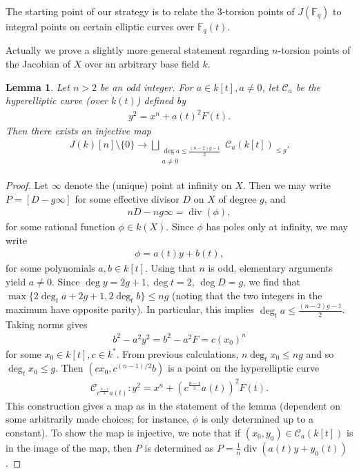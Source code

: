 \documentclass[11pt]{article}
\theoremstyle{plain}
\newtheorem{lemma}[theorem]{Lemma}
\theoremstyle{definition}
\DeclareMathOperator{\divisor}{div}
\begin{document}
The starting point of our strategy is to relate the $3$-torsion points of $J(\mathbb{F}_q)$ to integral points on certain elliptic curves over $\mathbb{F}_q(t)$.

Actually we prove a slightly more general statement regarding $n$-torsion points of the Jacobian of $X$ over an arbitrary base field $k$.



\begin{lemma}
\label{lemma:maintrick}
Let $n>2$ be an odd integer. For $a\in k[t], a\neq 0$, let $\mathcal{C}_a$ be the hyperelliptic curve (over $k(t)$) defined by
\begin{align*}
y^2=x^n+a(t)^2F(t).
\end{align*} 
Then there exists an injective map
\begin{align*}
J(k)[n]\setminus\{0\}\to \bigsqcup_{\substack{\deg a\leq \frac{(n-2)g-1}{2}\\a\neq 0}} \mathcal{C}_a(k[t])_{\leq g}.
\end{align*}
\end{lemma}


\begin{proof}
Let $\infty$ denote the (unique) point at infinity on $X$. Then we may write $P=[D-g\infty]$ for some effective divisor $D$ on $X$ of degree $g$, and 
\begin{align*}
nD-ng\infty=\divisor(\phi),
\end{align*}
for some rational function $\phi\in k(X)$. Since $\phi$ has poles only at infinity, we may write
\begin{align*}
\phi=a(t)y+b(t),
\end{align*}
for some polynomials $a,b\in k[t]$. Using that $n$ is odd, elementary arguments yield $a\neq 0$. Since $\deg y=2g+1, \deg t=2$, $\deg D=g$, we find that $\max\{2\deg_t a+2g+1,2\deg_t b\}\leq ng$ (noting that the two integers in the maximum have opposite parity). In particular, this implies $\deg_ta\leq \frac{(n-2)g-1}{2}$. Taking norms gives
\begin{align*}
b^2-a^2y^2=b^2-a^2F=c(x_0)^n
\end{align*}
for some $x_0\in k[t], c\in k^*$. From previous calculations, $n\deg_t x_0\leq ng$ and so $\deg_t x_0\leq g$. Then $(cx_0,c^{(n-1)/2}b)$ is a point on the hyperelliptic curve
\begin{align*}
\mathcal{C}_{c^{\frac{n-1}{2}}a(t)}:y^2=x^n+(c^{\frac{n-1}{2}}a(t))^2F(t).
\end{align*}
This construction gives a map as in the statement of the lemma (dependent on some arbitrarily made choices; for instance, $\phi$ is only determined up to a constant). To show the map is injective, we note that if $(x_0,y_0)\in \mathcal{C}_a(k[t])$ is in the image of the map, then $P$ is determined as $P=\frac{1}{n}\divisor(a(t)y+y_0(t))$.
\end{proof}
\end{document}
